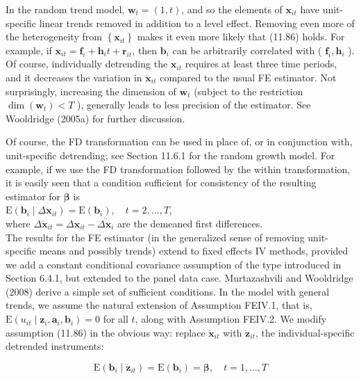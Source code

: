 \documentclass[10pt]{article}
\begin{document}
In the random trend model, $\mathbf{w}_{t}=(1, t)$, and so the elements of $\mathbf{x}_{i t}$ have unit-specific linear trends removed in addition to a level effect. Removing even more of the heterogeneity from $\left\{\mathbf{x}_{i t}\right\}$ makes it even more likely that (11.86) holds. For example, if $\mathbf{x}_{i t}=\mathbf{f}_{i}+\mathbf{h}_{i} t+\mathbf{r}_{i t}$, then $\mathbf{b}_{i}$ can be arbitrarily correlated with ( $\mathbf{f}_{i}, \mathbf{h}_{i}$ ). Of course, individually detrending the $\mathbf{x}_{i t}$ requires at least three time periods, and it decreases the variation in $\ddot{\mathbf{x}}_{i t}$ compared to the usual FE estimator. Not surprisingly, increasing the dimension of $\mathbf{w}_{t}$ (subject to the restriction $\operatorname{dim}\left(\mathbf{w}_{t}\right)<T$ ), generally leads to less precision of the estimator. See Wooldridge (2005a) for further discussion.

Of course, the FD transformation can be used in place of, or in conjunction with, unit-specific detrending; see Section 11.6.1 for the random growth model. For example, if we use the FD transformation followed by the within transformation, it is easily seen that a condition sufficient for consistency of the resulting estimator for $\boldsymbol{\beta}$ is\\
$\mathrm{E}\left(\mathbf{b}_{i} \mid \Delta \ddot{\mathbf{x}}_{i t}\right)=\mathrm{E}\left(\mathbf{b}_{i}\right), \quad t=2, \ldots, T$,\\
where $\Delta \ddot{\mathbf{x}}_{i t}=\Delta \mathbf{x}_{i t}-\overline{\Delta \mathbf{x}_{i}}$ are the demeaned first differences.\\
The results for the FE estimator (in the generalized sense of removing unit-specific means and possibly trends) extend to fixed effects IV methods, provided we add a constant conditional covariance assumption of the type introduced in Section 6.4.1, but extended to the panel data case. Murtazashvili and Wooldridge (2008) derive a simple set of sufficient conditions. In the model with general trends, we assume the natural extension of Assumption FEIV.1, that is, $\mathrm{E}\left(u_{i t} \mid \mathbf{z}_{i}, \mathbf{a}_{i}, \mathbf{b}_{i}\right)=0$ for all $t$, along with Assumption FEIV.2. We modify assumption (11.86) in the obvious way: replace $\ddot{\mathbf{x}}_{i t}$ with $\ddot{\mathbf{z}}_{i t}$, the individual-specific detrended instruments:


\begin{equation*}
\mathrm{E}\left(\mathbf{b}_{i} \mid \ddot{\mathbf{z}}_{i t}\right)=\mathrm{E}\left(\mathbf{b}_{i}\right)=\boldsymbol{\beta}, \quad t=1, \ldots, T \tag{11.89}
\end{equation*}
\end{document}
